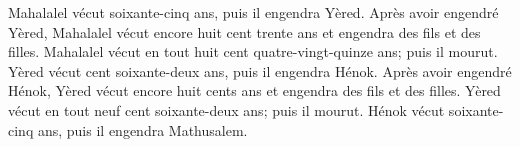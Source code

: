 Mahalalel vécut soixante-cinq ans, puis il engendra Yèred.
Après avoir engendré Yèred, Mahalalel vécut encore huit cent trente ans
	et engendra des fils et des filles.
Mahalalel vécut en tout huit cent quatre-vingt-quinze ans; puis il mourut.
Yèred vécut cent soixante-deux ans, puis il engendra Hénok.
Après avoir engendré Hénok,
	Yèred vécut encore huit cents ans et engendra des fils et des filles.
Yèred vécut en tout neuf cent soixante-deux ans; puis il mourut.
Hénok vécut soixante-cinq ans, puis il engendra Mathusalem.
